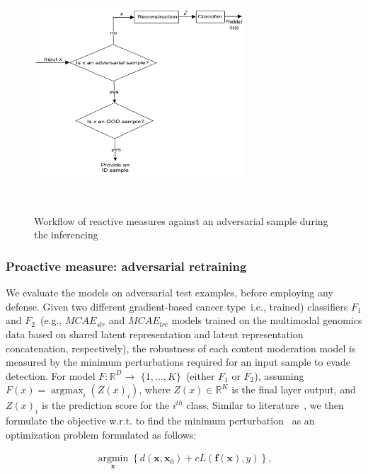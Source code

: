 \begin{figure}[htp!]
    \centering
    \includegraphics[width=0.7\textwidth,height=90mm]{images/reactive_measure.png}
    \caption{Workflow of reactive measures against an adversarial sample during the inferencing}
    \label{fig:reactive_measures}
    \vspace{-4mm}
\end{figure}

\subsubsection{Proactive measure: adversarial retraining}
We evaluate the models on adversarial test examples, before employing any defense. Given two different gradient-based cancer type~i.e., trained) classifiers $F_1$ and $F_2$~(e.g., $MCAE_{slr}$ and $MCAE_{lrc}$ models trained on the multimodal genomics data based on shared latent representation and latent representation concatenation, respectively), the robustness of each content moderation model is measured by the minimum perturbations required for an input sample to evade detection. For model $F: \mathbb{R}^{D} \rightarrow$ $\{1, \ldots, K\}$~(either $F_1$ or $F_2$), assuming $F(x)=\operatorname{argmax}_{i}\left(Z(x)_{i}\right)$, where $Z(x) \in\mathbb{R}^{K}$ is the final layer output, and $Z(x)_{i}$ is the prediction score for the $i^{th}$ class. Similar to literature~\cite{bhatt2020explainable}, we then formulate the objective w.r.t. to find the minimum perturbation~\cite{bhatt2020explainable} as an optimization problem formulated as follows:

\vspace{-6mm}
\begin{align}
    \underset{\boldsymbol{x}}{\operatorname{argmin}}\left\{d\left(\boldsymbol{x}, \boldsymbol{x}_{0}\right)+c {L}(\boldsymbol{f}(\boldsymbol{x}), y)\right\},
\end{align}

